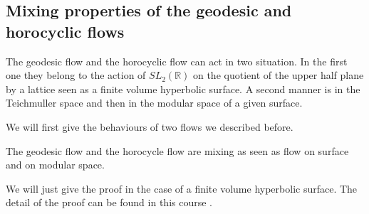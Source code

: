 \subsection{Mixing properties of the geodesic and horocyclic flows}

The geodesic flow and the horocyclic flow can act in two situation. In the first one they belong to the action of $SL_2(\mathbb{R})$ on the quotient of the upper half plane by a lattice seen as a finite volume hyperbolic surface. A second manner is in the Teichmuller space and then in the modular space of a given surface.

We will first give the behaviours of two flows we described before.

\begin{thm}
The geodesic flow and the horocycle flow are mixing as seen as flow on surface and on modular space.
\end{thm}
We will just give the proof in the case of a finite volume hyperbolic surface.
The detail of the proof can be found in this course \cite{Mcmullen1998HyperbolicM}.

